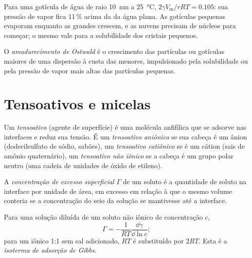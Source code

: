 Para uma gotícula de água de raio \qty{10}{nm} a \qty{25}{\celsius}, $2\gamma V_{\mathrm m}/rRT = 0.105$: sua pressão
de vapor fica 11\,\% acima da da água plana. As gotículas pequenas evaporam enquanto
as grandes crescem, e as nuvens precisam de núcleos para começar; o mesmo vale para
a solubilidade dos cristais pequenos.

\begin{definition}\label{def:b3:colloids:ripening}
O \emph{amadurecimento de Ostwald} é o crescimento das
partículas ou gotículas maiores de uma dispersão à custa das menores,
impulsionado pela solubilidade ou pela pressão de vapor mais altas das partículas pequenas.
\end{definition}

\section{Tensoativos e micelas}

\begin{definition}[Tensoativo]\label{def:b3:colloids:surfactant}
Um \emph{tensoativo} (agente de superfície) é uma molécula anfifílica
que se adsorve nas interfaces e reduz sua tensão. É um \emph{tensoativo
aniônico} se sua cabeça é um ânion (dodecilsulfato de
sódio, sabões), um \emph{tensoativo catiônico}
se é um cátion (sais de amônio quaternário), um \emph{tensoativo não
iônico} se a cabeça é um grupo polar neutro (uma
cadeia de unidades de óxido de etileno).
\end{definition}

\begin{definition}\label{def:b3:colloids:surface-excess}
A \emph{concentração de excesso superficial} $\Gamma$ de um
soluto é a quantidade de soluto na interface por unidade de área, em excesso em
relação à que o mesmo volume conteria se a concentração do seio da solução se
mantivesse até a interface.
\end{definition}

\begin{theorem}\label{thm:b3:colloids:gibbs-adsorption}
Para uma solução diluída de um soluto não iônico de concentração $c$,
\[
  \Gamma = -\frac{1}{RT}\frac{\dd\gamma}{\dd\ln c};
\]
para um  iônico 1:1 sem sal adicionado, $RT$ é substituído por $2RT$. Esta
é a \emph{isoterma de adsorção de Gibbs}.
\end{theorem}

